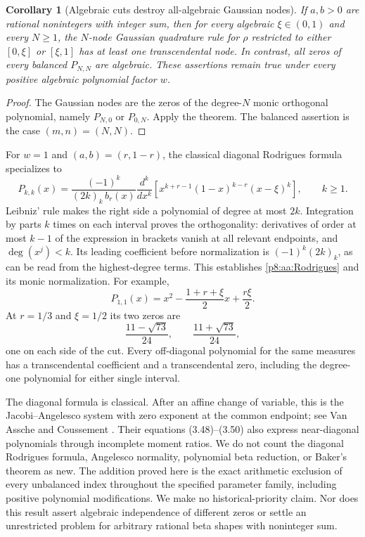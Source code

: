 \documentclass[11pt,a4paper]{article}
\newtheorem{corollary}[theorem]{Corollary}
\theoremstyle{definition}
\theoremstyle{remark}
\numberwithin{equation}{section}
\begin{document}
\begin{corollary}[Algebraic cuts destroy all-algebraic Gaussian nodes]
\label{p8:aa:gauss}
If $a,b>0$ are rational nonintegers with integer sum, then for every
algebraic $\xi\in(0,1)$ and every $N\ge1$, the $N$-node Gaussian
quadrature rule for $\rho$ restricted to either $[0,\xi]$ or
$[\xi,1]$ has at least one transcendental node. In contrast, all
zeros of every balanced $P_{N,N}$ are algebraic. These assertions
remain true under every positive algebraic polynomial factor $w$.
\end{corollary}

\begin{proof}
The Gaussian nodes are the zeros of the degree-$N$ monic orthogonal
polynomial, namely $P_{N,0}$ or $P_{0,N}$. Apply the theorem.
The balanced assertion is the case $(m,n)=(N,N)$.
\end{proof}

For $w=1$ and $(a,b)=(r,1-r)$, the classical diagonal Rodrigues
formula specializes to
\begin{equation}\label{p8:aa:Rodrigues}
 P_{k,k}(x)=\frac{(-1)^k}{(2k)_k\,b_r(x)}
 \frac{d^k}{dx^k}
 \left[x^{k+r-1}(1-x)^{k-r}(x-\xi)^k\right],\qquad k\ge1.
\end{equation}
Leibniz' rule makes the right side a polynomial of degree at most
$2k$. Integration by parts $k$ times on each interval proves the
orthogonality: derivatives of order at most $k-1$ of the expression
in brackets vanish at all relevant endpoints, and
$\deg(x^j)<k$. Its leading coefficient before normalization is
$(-1)^k(2k)_k$, as can be read from the highest-degree terms.
This establishes \eqref{p8:aa:Rodrigues} and its monic normalization.
For example,
\[
 P_{1,1}(x)=x^2-\frac{1+r+\xi}{2}x+\frac{r\xi}{2}.
\]
At $r=1/3$ and $\xi=1/2$ its two zeros are
\[
 \frac{11-\sqrt{73}}{24},\qquad
 \frac{11+\sqrt{73}}{24},
\]
one on each side of the cut. Every off-diagonal polynomial for the
same measures has a transcendental coefficient and a transcendental
zero, including the degree-one polynomial for either single interval.

The diagonal formula is classical. After an affine change of variable,
this is the Jacobi--Angelesco system with zero exponent at the common
endpoint; see Van Assche and Coussement \cite[\S3.5,
Eq.~(3.45)]{p8:aa:VanAsscheCoussement}. Their equations (3.48)--(3.50)
also express near-diagonal polynomials through incomplete moment
ratios. We do not count the diagonal Rodrigues formula, Angelesco
normality, polynomial beta reduction, or Baker's theorem as new.
The addition proved here is the exact arithmetic exclusion of every
unbalanced index throughout the specified parameter family, including
positive polynomial modifications. We make no historical-priority
claim. Nor does this result assert algebraic independence of different
zeros or settle an unrestricted problem for arbitrary rational beta
shapes with noninteger sum.
\end{document}
